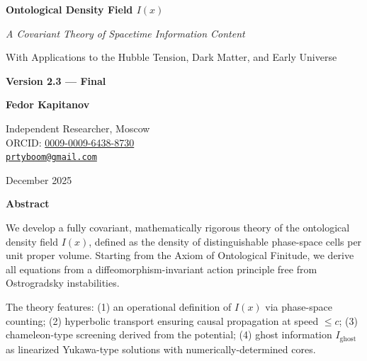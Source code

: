 \documentclass[12pt, a4paper]{article}
\begin{document}

\begin{titlepage}
\centering
\vspace*{1cm}

{\Huge\bfseries Ontological Density Field $I(x)$}

\vspace{0.6cm}

{\Large\itshape A Covariant Theory of Spacetime Information Content}

\vspace{0.4cm}

{\large With Applications to the Hubble Tension, Dark Matter, and Early Universe}

\vspace{0.3cm}

{\large\bfseries Version 2.3 — Final}

\vspace{1.5cm}

{\Large\bfseries Fedor Kapitanov}

\vspace{0.5cm}

{\large Independent Researcher, Moscow}\\[0.3cm]
{\large ORCID: \href{https://orcid.org/0009-0009-6438-8730}{0009-0009-6438-8730}}\\[0.3cm]
{\large \href{mailto:prtyboom@gmail.com}{\texttt{prtyboom@gmail.com}}}

\vspace{1.5cm}

{\large December 2025}

\vspace{1cm}

\begin{tcolorbox}[colback=blue!5!white, colframe=blue!75!black, width=0.95\textwidth]
\textbf{Abstract}

\vspace{0.2cm}

We develop a fully covariant, mathematically rigorous theory of the ontological density field $I(x)$, defined as the density of distinguishable phase-space cells per unit proper volume. Starting from the Axiom of Ontological Finitude, we derive all equations from a diffeomorphism-invariant action principle free from Ostrogradsky instabilities.

The theory features: (1) an operational definition of $I(x)$ via phase-space counting; (2) hyperbolic transport ensuring causal propagation at speed $\leq c$; (3) chameleon-type screening derived from the potential; (4) ghost information $I_{\text{ghost}}$ as linearized Yukawa-type solutions with numerically-determined cores.


\end{tcolorbox}
\end{titlepage}
\end{document}

